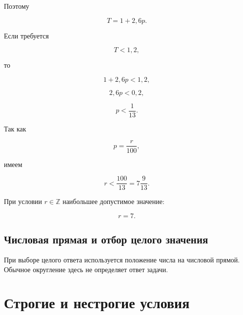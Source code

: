 \documentclass[a4paper,12pt]{article}
\begin{document}
Поэтому

\[
T=1+2{,}6p.
\]

Если требуется

\[
T<1{,}2,
\]

то

\[
1+2{,}6p<1{,}2,
\]

\[
2{,}6p<0{,}2,
\]

\[
p<\frac1{13}.
\]

Так как

\[
p=\frac r{100},
\]

имеем

\[
r<\frac{100}{13}
=
7\frac{9}{13}.
\]

При условии \(r\in\mathbb Z\) наибольшее допустимое значение:

\[
\boxed{r=7}.
\]

\subsection{Числовая прямая и отбор целого значения}

\begin{center}
\end{center}

При выборе целого ответа используется положение числа на числовой прямой.
Обычное округление здесь не определяет ответ задачи.


\section{Строгие и нестрогие условия}
\end{document}
